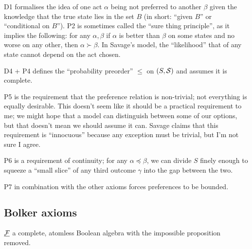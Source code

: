 D1 formalises the idea of one act $\alpha$ being not preferred to another $\beta$ given the knowledge that the true state lies in the set $B$ (in short: ``given $B$'' or ``conditional on $B$''). P2 is sometimes called the ``sure thing principle'', as it implies the following: for any $\alpha, \beta$ if $\alpha$ is better than $\beta$ on some states and no worse on any other, then $\alpha\succ \beta$. In Savage's model, the ``likelihood'' that of any state cannot depend on the act chosen.

D4 + P4 defines the ``probability preorder'' $\leqslant$ on $(S,\mathcal{S})$ and assumes it is complete.

P5 is the requirement that the preference relation is non-trivial; not everything is equally desirable. This doesn't seem like it should be a practical requirement to me; we might hope that a model can distinguish between some of our options, but that doesn't mean we should assume it can. Savage claims that this requirement is ``innocuous'' because any exception must be trivial, but I'm not sure I agree.

P6 is a requirement of continuity; for any $\alpha\preceq \beta$, we can divide $S$ finely enough to squeeze a ``small slice'' of any third outcome $\gamma$ into the gap between the two.

P7 in combination with the other axioms forces preferences to be bounded.

\subsection{Bolker axioms}\label{sec:bolker_axioms}

$\underline{\mathcal{F}}$ a complete, atomless Boolean algebra with the impossible proposition removed.
 

